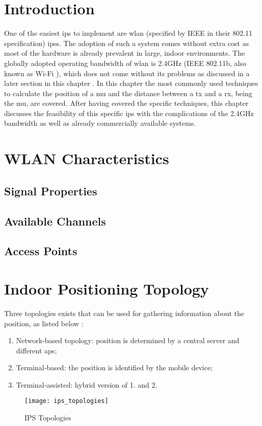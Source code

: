 \section{Introduction}
One of the easiest \acrlong{ips} to implement are \acrshort{wlan} (specified by IEEE in their 802.11 specification) \acrshort{ips}s. The adoption of such a system comes without extra cost as most of the hardware is already prevalent in large, indoor environments.  The globally adopted operating bandwidth of \acrshort{wlan} is 2.4GHz (IEEE 802.11b, also known as Wi-Fi \cite{Li}), which does not come without its problems as discussed in a later section in this chapter \cite{Techopedia} \cite{ElectronicsNotes}\cite{Cisco}. In this chapter the most commonly used techniques to calculate the position of a \acrlong{mu} and the distance between a \acrlong{tx} and a \acrlong{rx}, being the \acrlong{mu}, are covered. After having covered the specific techniques, this chapter discusses the feasibility of this specific \acrlong{ips} with the complications of the 2.4GHz bandwidth as well as already commercially available systems.
\section{WLAN Characteristics}
\subsection{Signal Properties}
\subsection{Available Channels}
\subsection{Access Points}
\section{Indoor Positioning Topology}
Three topologies exists that can be used for gathering information about the position, as listed below \cite{Henniges2012}:
\begin{enumerate}
\item Network-based topology: position is determined by a central server and different \acrshort{ap}s;
\item Terminal-based: the position is identified by the mobile device;
\item Terminal-assisted: hybrid version of 1. and 2.
\end{enumerate}
\begin{figure}[h!]
\centering
\texttt{[image: ips\_topologies]}
\caption{IPS Topologies ~\cite{Henniges2012}}
\label{fig:ips_topologies}
\end{figure}
